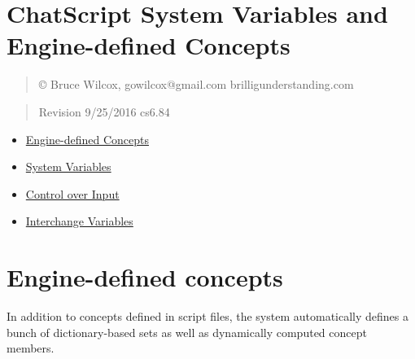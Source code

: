\documentclass[]{article}
\date{}
\providecommand{\tightlist}{%
  \setlength{\itemsep}{0pt}\setlength{\parskip}{0pt}}
\begin{document}
\section{ChatScript System Variables and Engine-defined
Concepts}\label{chatscript-system-variables-and-engine-defined-concepts}

\begin{quote}
© Bruce Wilcox, gowilcox@gmail.com brilligunderstanding.com
\end{quote}

\begin{quote}
Revision 9/25/2016 cs6.84
\end{quote}

\begin{itemize}
\tightlist
\item
  \href{ChatScript-System-Variables-and-Engine-defined-Concepts.md\#engine-defined-concepts}{Engine-defined
  Concepts}
\item
  \href{ChatScript-System-Variables-and-Engine-defined-Concepts.md\#system-variables}{System
  Variables}
\item
  \href{ChatScript-System-Variables-and-Engine-defined-Concepts.md\#control-over-input}{Control
  over Input}
\item
  \href{ChatScript-System-Variables-and-Engine-defined-Concepts.md\#interchange-variables}{Interchange
  Variables}
\end{itemize}

\section{Engine-defined concepts}\label{engine-defined-concepts}

In addition to concepts defined in script files, the system
automatically defines a bunch of dictionary-based sets as well as
dynamically computed concept members.
\end{document}
